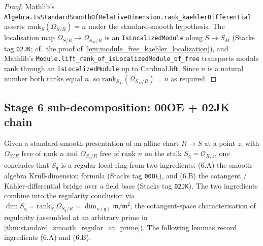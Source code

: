 \begin{proof}
  Mathlib's
  \texttt{Algebra.IsStandardSmoothOfRelativeDimension.\linebreak rank\_kaehlerDifferential}
  asserts \(\mathrm{rank}_S(\Omega_{S/R}) = n\) under the
  standard-smooth hypothesis. The localisation map
  \(\Omega_{S/R} \to \Omega_{S_M/R}\) is an
  \texttt{IsLocalizedModule} along \(S \to S_M\) (Stacks tag
  \texttt{02JK}; cf.\ the proof of
  \cref{lem:module_free_kaehler_localization}), and Mathlib's
  \texttt{Module.lift\_rank\_of\_isLocalizedModule\_of\_free} transports
  module rank through an \texttt{IsLocalizedModule} up to
  \(\mathrm{Cardinal.lift}\). Since \(n\) is a natural number both
  ranks equal \(n\), so
  \(\mathrm{rank}_{S_M}(\Omega_{S_M / R}) = n\) as required.
\end{proof}

\subsection{Stage 6 sub-decomposition: 00OE + 02JK chain}
\label{subsec:stage6_subgap_decomposition}

Given a standard-smooth presentation of an affine chart \(R \to S\) at a
point \(z\), with \(\Omega_{S/R}\) free of rank \(n\) and
\(\Omega_{S_\mathfrak q / R}\) free of rank \(n\) on the stalk
\(S_\mathfrak q = \mathcal O_{X, z}\), one concludes that \(S_\mathfrak q\)
is a regular local ring from two ingredients: (6.A) the smooth-algebra
Krull-dimension formula (Stacks tag \texttt{00OE}), and (6.B) the cotangent /
K\"ahler-differential bridge over a field base (Stacks tag \texttt{02JK}). The
two ingredients combine into the regularity conclusion via
\(\dim S_\mathfrak q = \mathrm{rank}_{S_\mathfrak q}\Omega_{S_\mathfrak
q / R} = \dim_{\kappa(\mathfrak q)} \mathfrak m / \mathfrak m^2\),
the cotangent-space characterisation of regularity (assembled at an arbitrary
prime in \cref{thm:standard_smooth_regular_at_prime}). The following lemmas
record ingredients (6.A) and (6.B).

